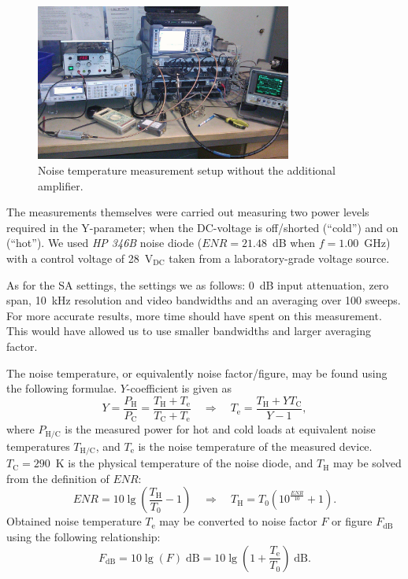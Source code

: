 \documentclass[a4paper, 12pt]{article}
\begin{document}
\begin{figure}[h!]
	\begin{center}
	\includegraphics[width=0.75\textwidth]{img/nd-ddu-sa.jpg}
	\caption{Noise temperature measurement setup without the additional amplifier.}
	\label{f:nd2}
	\end{center}
	\vspace*{-12pt}
\end{figure}

The measurements themselves were carried out measuring two power levels required in the 
Y-pa\-ram\-e\-ter; when the DC-voltage is off/shorted (``cold'') and on (``hot''). We 
used \textit{HP 346B} noise diode ($\textit{ENR} = 21.48$~dB when $f = 1.00$~GHz) with 
a control voltage of 28~V$_\mathrm{DC}$ taken from a laboratory-grade voltage source.

As for the SA settings, the settings we as follows: 0~dB input attenuation, zero span, 
10~kHz resolution and video bandwidths and an averaging over 100 sweeps. For more accurate 
results, more time should have spent on this measurement. This would have allowed us to use 
smaller bandwidths and larger averaging factor.

The noise temperature, or equivalently noise factor/figure, may be found using the following
formulae. $Y$-coefficient is given as
\begin{equation}\label{e:Y}
Y = \frac{P_\mathrm{H}}{P_\mathrm{C}} 
	= \frac{T_\mathrm{H} + T_\mathrm{e}}{T_\mathrm{C} + T_\mathrm{e}}
	\quad\Rightarrow\quad
	T_\mathrm{e} = \frac{T_\mathrm{H} + YT_\mathrm{C}}{Y - 1},
\end{equation}
where $P_\mathrm{H/C}$ is the measured power for hot and cold loads at equivalent noise 
temperatures $T_\mathrm{H/C}$, and $T_\mathrm{e}$ is the noise temperature of the measured 
device. $T_\mathrm{C} = 290$~K is the physical temperature of the noise diode, and 
$T_\mathrm{H}$ may be solved from the definition of $\textit{ENR}$:
\begin{equation}\label{e:ENR}
\mathit{ENR} = 10 \lg \left( \frac{T_\mathrm{H}}{T_\mathrm{0}} - 1 \right) 
	\quad\Rightarrow\quad
	T_\mathrm{H} = T_\mathrm{0} \left( 10^\frac{\mathit{ENR}}{10} + 1 \right).
\end{equation}
Obtained noise temperature $T_\mathrm{e}$ may be converted to noise factor $F$ or figure 
$F_\mathrm{dB}$ using the following relationship:
\begin{equation}
F_\mathrm{dB} = 10 \lg \left( F \right) \mathrm{\;dB} =  10 \lg \left( 1 + \frac{T_\mathrm{e}}{T_0} \right) \mathrm{\;dB}.
\end{equation}
\end{document}
